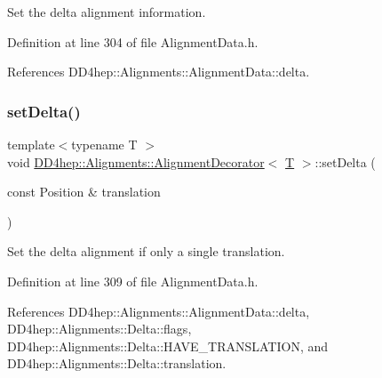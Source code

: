Set the delta alignment information. 



Definition at line 304 of file Alignment\+Data.\+h.



References D\+D4hep\+::\+Alignments\+::\+Alignment\+Data\+::delta.

\hypertarget{class_d_d4hep_1_1_alignments_1_1_alignment_decorator_a46ef14105fac953846eba7dc798f3357}{}\label{class_d_d4hep_1_1_alignments_1_1_alignment_decorator_a46ef14105fac953846eba7dc798f3357} 
\subsubsection{\texorpdfstring{set\+Delta()}{setDelta()}\hspace{0.1cm}{\footnotesize\ttfamily [2/4]}}
{\footnotesize\ttfamily template$<$typename T $>$ \\
void \hyperlink{class_d_d4hep_1_1_alignments_1_1_alignment_decorator}{D\+D4hep\+::\+Alignments\+::\+Alignment\+Decorator}$<$ \hyperlink{class_t}{T} $>$\+::set\+Delta (\begin{DoxyParamCaption}\item[{const Position \&}]{translation }\end{DoxyParamCaption})\hspace{0.3cm}{\ttfamily [inline]}}



Set the delta alignment if only a single translation. 



Definition at line 309 of file Alignment\+Data.\+h.



References D\+D4hep\+::\+Alignments\+::\+Alignment\+Data\+::delta, D\+D4hep\+::\+Alignments\+::\+Delta\+::flags, D\+D4hep\+::\+Alignments\+::\+Delta\+::\+H\+A\+V\+E\+\_\+\+T\+R\+A\+N\+S\+L\+A\+T\+I\+ON, and D\+D4hep\+::\+Alignments\+::\+Delta\+::translation.

\hypertarget{class_d_d4hep_1_1_alignments_1_1_alignment_decorator_a27ae7e7f8aba1fed3c76ab63f985a627}{}\label{class_d_d4hep_1_1_alignments_1_1_alignment_decorator_a27ae7e7f8aba1fed3c76ab63f985a627} 
